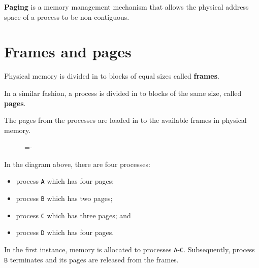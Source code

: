 \documentclass[a4paper]{systems-software}
\begin{document}
\textbf{Paging} is a memory management mechanism that allows the physical address space of a process to be non-contiguous.


\section*{Frames and pages}

Physical memory is divided in to blocks of equal sizes called \textbf{frames}.

In a similar fashion, a process is divided in to blocks of the same size, called \textbf{pages}.

The pages from the processes are loaded in to the available frames in physical memory.

\begin{figure}[H]
  \lineskip=-\fboxrule
\end{figure}

In the diagram above, there are four processes:
\begin{itemize}
	\item process \texttt{A} which has four pages;
	\item process \texttt{B} which has two pages;
	\item process \texttt{C} which has three pages; and
	\item process \texttt{D} which has four pages.
\end{itemize}

In the first instance, memory is allocated to processes \texttt{A}-\texttt{C}. Subsequently, process \texttt{B} terminates and its pages are released from the frames.
\end{document}
